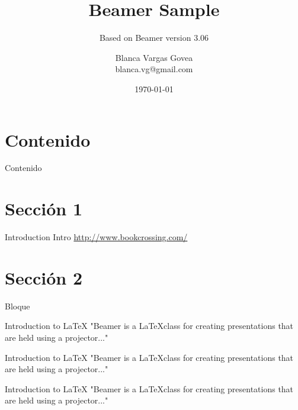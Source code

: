 \documentclass[xcolor=dvipsnames]{beamer}
\begin{document}
\title{Beamer Sample}
\subtitle{Based on Beamer version 3.06}
\author{Blanca Vargas Govea \\ blanca.vg@gmail.com}
\date{\today}

\begin{frame}[plain] 
  \titlepage
\end{frame}
\section*{Contenido}
\begin{frame}{Contenido}
  \tableofcontents%
\end{frame}
\section{Secci\'{o}n 1}
\begin{frame}{Introduction}
Intro
\url{http://www.bookcrossing.com/}
\end{frame}

\section{Secci\'{o}n 2}

\begin{frame}{Bloque}
\begin{block}{Introduction to {\LaTeX}}
"Beamer is a {\LaTeX}class for creating presentations
that are held using a projector..."
\end{block}

\begin{example}{Introduction to {\LaTeX}}
"Beamer is a {\LaTeX}class for creating presentations
that are held using a projector..."
\end{example}

\begin{alertblock}{Introduction to {\LaTeX}}
"Beamer is a {\LaTeX}class for creating presentations
that are held using a projector..."
\end{alertblock}

\end{frame}
%
%
\end{document}
